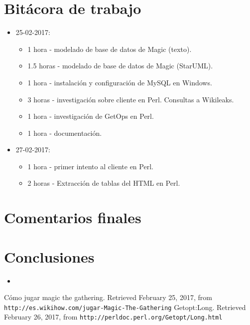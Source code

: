\documentclass{IEEEtran}
\begin{document}
\section{Bit\'acora de trabajo}
\begin{itemize}
  \item 25-02-2017:
  \begin{itemize}
    \item 1 hora - modelado de base de datos de Magic (texto).
    \item 1.5 horas - modelado de base de datos de Magic (StarUML).
    \item 1 hora - instalaci\'on y configuraci\'on de MySQL en Windows.
    \item 3 horas - investigaci\'on sobre cliente en Perl. Consultas a Wikileaks.
    \item 1 hora - investigaci\'on de GetOps en Perl.
    \item 1 hora - documentaci\'on.
  \end{itemize}
  \item 27-02-2017:
  \begin{itemize}
    \item 1 hora - primer intento al cliente en Perl.
    \item 2 horas - Extracci\'on de tablas del HTML en Perl.
  \end{itemize}
\end{itemize}

\section{Comentarios finales}

\section{Conclusiones}

\begin{itemize}
  \item 
\end{itemize}

\begin{thebibliography}{99}
  Cómo jugar magic the gathering. Retrieved February 25, 2017, from  \texttt{http://es.wikihow.com/jugar-Magic-The-Gathering}
  Getopt:Long. Retrieved February 26, 2017, from \texttt{http://perldoc.perl.org/Getopt/Long.html}
\end{thebibliography}
\end{document}
